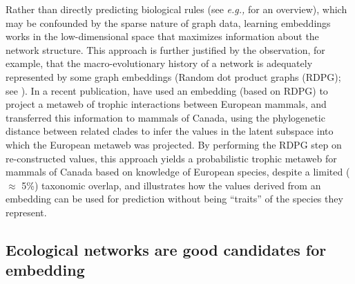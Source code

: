 \begin{refsection}
Rather than directly predicting biological rules (see \emph{e.g.,}
\cite{Pichler2020Machine} for an overview), which may be confounded by the
sparse nature of graph data, learning embeddings works in the
low-dimensional space that maximizes information about the network
structure. This approach is further justified by the observation, for
example, that the macro-evolutionary history of a network is adequately
represented by some graph embeddings (Random dot product graphs
(RDPG); see \cite{DallaRiva2016Exploring}). In a recent publication,
\cite{Strydom2022Food} have used an embedding (based on RDPG) to project a
metaweb of trophic interactions between European mammals, and
transferred this information to mammals of Canada, using the
phylogenetic distance between related clades to infer the values in the
latent subspace into which the European metaweb was projected. By
performing the RDPG step on re-constructed values, this approach yields
a probabilistic trophic metaweb for mammals of Canada based on knowledge
of European species, despite a limited (\(\approx\) 5\%) taxonomic
overlap, and illustrates how the values derived from an embedding can be
used for prediction without being ``traits'' of the species they
represent.

\subsection{Ecological networks are good candidates for
embedding}\label{ecological-networks-are-good-candidates-for-embedding}


\end{refsection}
